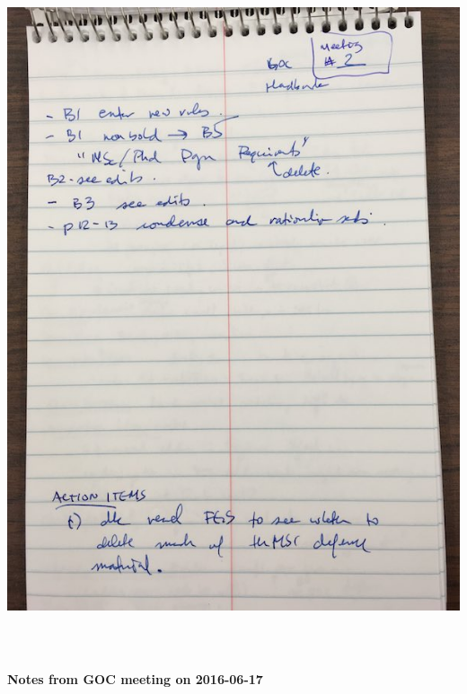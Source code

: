 \documentclass[12pt]{article}
\begin{document}
\includegraphics[height=8in]{meetings/20160612/20160612_meeting_notes.jpg}

\newpage
\textbf{\large Notes from GOC meeting on 2016-06-17} \label{mn:20160617}
\end{document}
